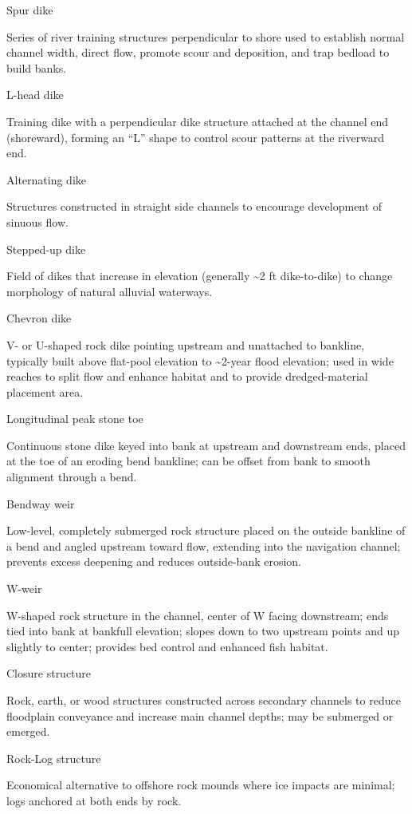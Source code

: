 \documentclass[
  letterpaper,
  DIV=11,
  numbers=noendperiod]{scrreprt}
\begin{document}
Spur dike

Series of river training structures perpendicular to shore used to
establish normal channel width, direct flow, promote scour and
deposition, and trap bedload to build banks.

L-head dike

Training dike with a perpendicular dike structure attached at the
channel end (shoreward), forming an ``L'' shape to control scour
patterns at the riverward end.

Alternating dike

Structures constructed in straight side channels to encourage
development of sinuous flow.

Stepped-up dike

Field of dikes that increase in elevation (generally \textasciitilde2 ft
dike-to-dike) to change morphology of natural alluvial waterways.

Chevron dike

V- or U-shaped rock dike pointing upstream and unattached to bankline,
typically built above flat-pool elevation to \textasciitilde2-year flood
elevation; used in wide reaches to split flow and enhance habitat and to
provide dredged-material placement area.

Longitudinal peak stone toe

Continuous stone dike keyed into bank at upstream and downstream ends,
placed at the toe of an eroding bend bankline; can be offset from bank
to smooth alignment through a bend.

Bendway weir

Low-level, completely submerged rock structure placed on the outside
bankline of a bend and angled upstream toward flow, extending into the
navigation channel; prevents excess deepening and reduces outside-bank
erosion.

W-weir

W-shaped rock structure in the channel, center of W facing downstream;
ends tied into bank at bankfull elevation; slopes down to two upstream
points and up slightly to center; provides bed control and enhanced fish
habitat.

Closure structure

Rock, earth, or wood structures constructed across secondary channels to
reduce floodplain conveyance and increase main channel depths; may be
submerged or emerged.

Rock-Log structure

Economical alternative to offshore rock mounds where ice impacts are
minimal; logs anchored at both ends by rock.
\end{document}
